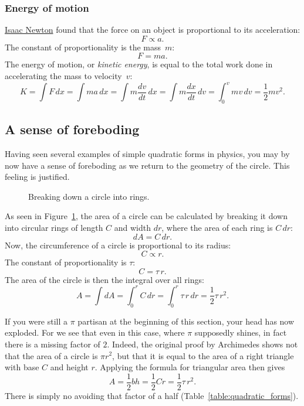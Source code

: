     \subsubsection{Energy of motion} %
    \label{sec:energy_of_motion}

\href{https://en.wikipedia.org/wiki/Isaac_Newton}{Isaac Newton} found that the force on an object is proportional to its acceleration:
\[ F \propto a. \]
The constant of proportionality is the mass~$m$:
\[ F = m a. \]
The energy of motion, or \emph{kinetic energy}, is equal to the total work done in accelerating the mass to velocity~$v$:
\[ K = \int F\,dx = \int ma\,dx = \int m\frac{dv}{dt}\,dx = \int m\frac{dx}{dt}\,dv = \int_0^v mv\,dv = \textstyle{\frac{1}{2}} mv^2. \]

  \subsection{A sense of foreboding} %
  \label{sec:a_sense_of_foreboding}

Having seen several examples of simple quadratic forms in physics, you may by now have a sense of foreboding as we return to the geometry of the circle. This feeling is justified.

\begin{figure}
\begin{center}
\end{center}
\caption{Breaking down a circle into rings.\label{fig:circular_area}}
\end{figure}


As seen in Figure~\ref{fig:circular_area}, the area of a circle can be calculated by breaking it down into circular rings of length $C$ and width $dr$, where the area of each ring is $C\,dr$:
\[ dA = C\,dr. \]
Now, the circumference of a circle is proportional to its radius:
\[ C \propto r. \]
The constant of proportionality is $\tau$:
\[ C = \tau\,r. \]
The area of the circle is then the integral over all rings:
\[ A = \int dA = \int_0^r C\,dr = \int_0^r \tau\,r\,dr = \textstyle{\frac{1}{2}} \tau\,r^2. \]

If you were still a $\pi$ partisan at the beginning of this section, your head has now exploded. For we see that even in this case, where $\pi$ supposedly shines, in fact there is a missing factor of $2$. Indeed, the original proof by Archimedes shows not that the area  of a circle is $\pi r^2$, but that it is equal to the area of a right triangle with base $C$ and height $r$. Applying the formula for triangular area then gives
\[
  A = \textstyle{\frac{1}{2}} bh = \textstyle{\frac{1}{2}}Cr = \textstyle{\frac{1}{2}}\tau\,r^2.
\]
There is simply no avoiding that factor of a half (Table~\ref{table:quadratic_forms}).

